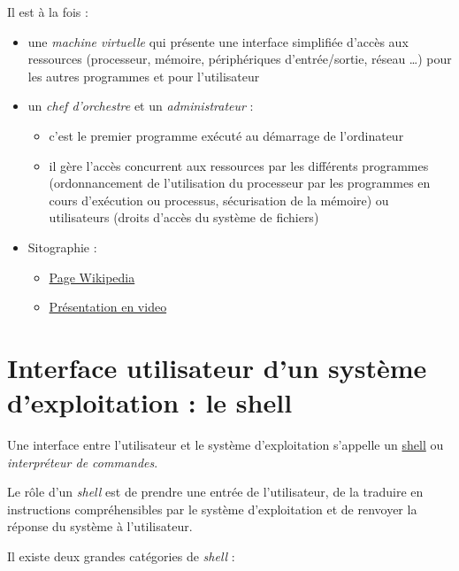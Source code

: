 \documentclass[
  11pt,
]{article}
\providecommand{\tightlist}{%
  \setlength{\itemsep}{0pt}\setlength{\parskip}{0pt}}
\newcounter{cours}
\newcounter{prog}
\begin{document}
Il est à la fois :

\begin{itemize}
\item
  une \emph{machine virtuelle} qui présente une interface simplifiée
  d'accès aux ressources (processeur, mémoire, périphériques
  d'entrée/sortie, réseau \ldots) pour les autres programmes et pour
  l'utilisateur
\item
  un \emph{chef d'orchestre} et un \emph{administrateur} :

  \begin{itemize}
  \tightlist
  \item
    c'est le premier programme exécuté au démarrage de l'ordinateur
  \item
    il gère l'accès concurrent aux ressources par les différents
    programmes (ordonnancement de l'utilisation du processeur par les
    programmes en cours d'exécution ou processus, sécurisation de la
    mémoire) ou utilisateurs (droits d'accès du système de fichiers)
  \end{itemize}
\item
  Sitographie :

  \begin{itemize}
  \tightlist
  \item
    \href{https://fr.wikipedia.org/wiki/Syst\%C3\%A8me_d\%27exploitation}{Page
    Wikipedia}
  \item
    \href{https://www.lumni.fr/video/comprendre-ce-qu-est-un-systeme-d-exploitation}{Présentation
    en video}
  \end{itemize}
\end{itemize}

\hypertarget{interface-utilisateur-dun-systuxe8me-dexploitation-le-shell}{%
\section{Interface utilisateur d'un système d'exploitation : le
shell}\label{interface-utilisateur-dun-systuxe8me-dexploitation-le-shell}}

Une interface entre l'utilisateur et le système d'exploitation s'appelle
un \href{https://fr.wikipedia.org/wiki/Shell_Unix}{shell} ou
\emph{interpréteur de commandes}.

Le rôle d'un \emph{shell} est de prendre une entrée de l'utilisateur, de
la traduire en instructions compréhensibles par le système
d'exploitation et de renvoyer la réponse du système à l'utilisateur.

Il existe deux grandes catégories de \emph{shell} :
\end{document}
